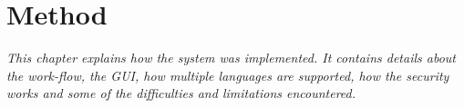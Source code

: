 \chapter{Method}

\textit{This chapter explains how the system was implemented. It contains details about the work-flow, the GUI, how multiple languages are supported, how the security works and some of the difficulties and limitations encountered.}







